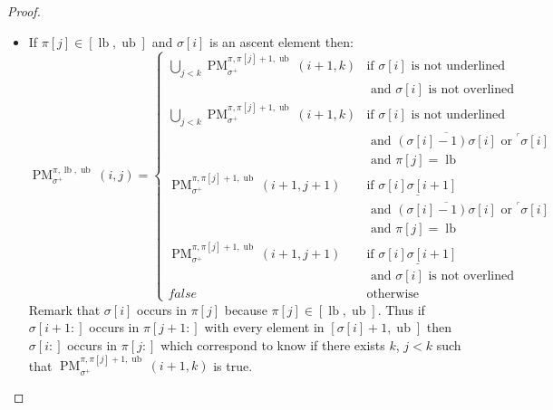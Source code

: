 \documentclass[a4paper]{llncs}
\newcommand{\ptext}{\pi}
\newcommand{\pmotif}{\sigma}
\newcommand{\pbmotif}{\pmotif^+}
\DeclareMathOperator{\PMa}{PM}
\newcommand{\PM}[6]{\PMa_{{#1}}^{{#2},{#3},{#4}}({#5},{#6})}
\DeclareMathOperator{\lb}{lb}
\DeclareMathOperator{\ub}{ub}
\begin{document}
\begin{proof}
\begin{itemize}
	\item If $\ptext[j] \in [\lb,\ub]$ and $\pmotif[i]$ is an ascent element then:
	$$
	\PM{\pbmotif}{\ptext}{\lb}{\ub}{i}{j}=
	\begin{cases}
		\bigcup_{j<k} \PM{\pbmotif}{\ptext}{\ptext[j]+1}{\ub}{i+1}{k}
			& \text{if $\pmotif[i]$ is not underlined } \\
			& \text{ and $\pmotif[i]$ is not overlined} \\
		\bigcup_{j<k} \PM{\pbmotif}{\ptext}{\ptext[j]+1}{\ub}{i+1}{k}
			& \text{if $\pmotif[i]$ is not underlined } \\
			& \text{ and $\overline{(\pmotif[i]-1)\pmotif[i]}$ or $^\ulcorner{\pmotif[i]}$}\\
			& \text{ and $\ptext[j]=\lb$} \\
		\PM{\pbmotif}{\ptext}{\ptext[j]+1}{\ub}{i+1}{j+1}
			& \text{if $\underline{\pmotif[i]\pmotif[i+1]}$ } \\
			& \text{ and $\overline{(\pmotif[i]-1)\pmotif[i]}$ or $^\ulcorner{\pmotif[i]}$}\\
			& \text{ and $\ptext[j]=\lb$} \\
		\PM{\pbmotif}{\ptext}{\ptext[j]+1}{\ub}{i+1}{j+1}
			& \text{if $\underline{\pmotif[i]\pmotif[i+1]}$ } \\
			& \text{ and $\pmotif[i]$ is not overlined} \\
		false & \text{otherwise}

	\end{cases}
	$$	
	Remark that $\pmotif[i]$ occurs in $\ptext[j]$ because $\ptext[j] \in [\lb,\ub]$.
	Thus if $\pmotif[i+1:]$ occurs in $\ptext[j+1:]$ with every element 
	in $[\pmotif[i]+1,\ub]$ then 
 	$\pmotif[i:]$ occurs in $\ptext[j:]$  	
 	which correspond to know if there exists $k$, $j<k$ such that
	$\PM{\pbmotif}{\ptext}{\ptext[j]+1}{\ub}{i+1}{k}$ is true.


\end{itemize}
\end{proof}
\end{document}
